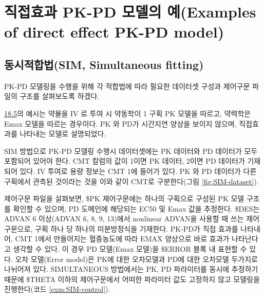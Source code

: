 \documentclass[
  10pt,
  krantz2,
  a4paper]{krantz}
\theoremstyle{definition}
\theoremstyle{definition}
\theoremstyle{definition}
\theoremstyle{remark}
\begin{document}
\hypertarget{direct-pkpd}{%
\section{직접효과 PK-PD 모델의 예(Examples of direct effect PK-PD model)}\label{direct-pkpd}}


\hypertarget{uxb3d9uxc2dcuxc801uxd569uxbc95sim-simultaneous-fitting}{%
\subsection{동시적합법(SIM, Simultaneous fitting)}\label{uxb3d9uxc2dcuxc801uxd569uxbc95sim-simultaneous-fitting}}


PK-PD 모델링을 수행을 위해 각 적합법에 따라 필요한 데이터셋 구성과 제어구문 파일의 구조를 살펴보도록 하겠다.

\protect\hyperlink{direct-pkpd}{18.5}의 예시는 약물을 IV 로 투여 시 약동학이 1 구획 PK 모델을 따르고, 약력학은 Emax 모델을 따르는 경우이다. PK 와 PD가 시간지연 양상을 보이지 않으며, 직접효과를 나타내는 모델로 설명되었다.

SIM 방법으로 PK-PD 모델링 수행시 데이터셋에는 PK 데이터와 PD 데이터가 모두 포함되어 있어야 한다. CMT 칼럼의 값이 1이면 PK 데이터, 2이면 PD 데이터가 기재되어 있다. IV 투여로 용량 정보는 CMT 1에 들어가 있다. PK 와 PD 데이터가 다른 구획에서 관측된 것이라는 것을 이와 같이 CMT로 구분한다(그림 \ref{fig:SIM-dataset}).

제어구문 파일을 살펴보면, \$PK 제어구문에는 하나의 구획으로 구성된 PK 모델 구조를 확인할 수 있으며, PD 도메인에 해당되는 EC50 및 Emax 값을 추정한다. \$DES는 ADVAN 6 이상(ADVAN 6, 8, 9, 13)에서 nonlinear ADVAN을 사용할 때 쓰는 제어구문으로, 구획 하나 당 하나의 미분방정식을 기재한다. PK-PD가 직접 효과를 나타내어, CMT 1에서 만들어지는 혈중농도에 따라 EMAX 양상으로 바로 효과가 나타난다고 생각할 수 있다. 이 경우 PD 모델(Emax 모델)을 \$ERROR 블록 내 표현할 수 있다. 오차 모델(Error model)은 PK에 대한 오차모델과 PD에 대한 오차모델 두가지로 나뉘어져 있다. SIMULTANEOUS 방법에서는 PK, PD 파라미터를 동시에 추정하기 때문에 \$THETA 이하의 제어구문에서 어떠한 파라미터 값도 고정하지 않고 모델링을 진행한다(코드 \ref{exm:SIM-control}).
\end{document}
